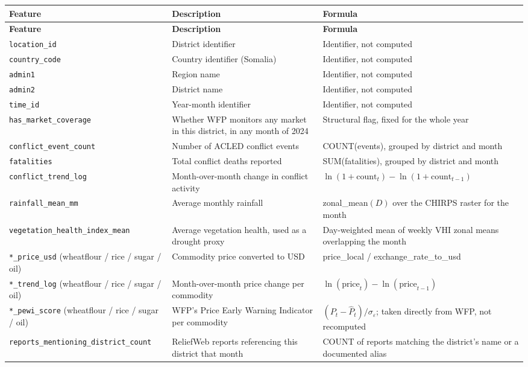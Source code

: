 \documentclass[12pt,a4paper]{article}
\begin{document}
\footnotesize
\begin{longtable}{p{4cm}p{4.3cm}p{5.7cm}}
\toprule
\textbf{Feature} & \textbf{Description} & \textbf{Formula} \\
\midrule
\endfirsthead
\toprule
\textbf{Feature} & \textbf{Description} & \textbf{Formula} \\
\midrule
\endhead
\texttt{location\_id} & District identifier & Identifier, not computed \\
\texttt{country\_code} & Country identifier (Somalia) & Identifier, not computed \\
\texttt{admin1} & Region name & Identifier, not computed \\
\texttt{admin2} & District name & Identifier, not computed \\
\texttt{time\_id} & Year-month identifier & Identifier, not computed \\
\texttt{has\_market\_coverage} & Whether WFP monitors any market in this district, in any month of 2024 & Structural flag, fixed for the whole year \\
\texttt{conflict\_event\_count} & Number of ACLED conflict events & COUNT(events), grouped by district and month \\
\texttt{fatalities} & Total conflict deaths reported & SUM(fatalities), grouped by district and month \\
\texttt{conflict\_trend\_log} & Month-over-month change in conflict activity & $\ln(1+\text{count}_t) - \ln(1+\text{count}_{t-1})$ \\
\texttt{rainfall\_mean\_mm} & Average monthly rainfall & zonal\_mean$(D)$ over the CHIRPS raster for the month \\
\texttt{vegetation\-\_health\-\_index\-\_mean} & Average vegetation health, used as a drought proxy & Day-weighted mean of weekly VHI zonal means overlapping the month \\
\texttt{*\_price\_usd} (wheatflour / rice / sugar / oil) & Commodity price converted to USD & price\_local / exchange\_rate\_to\_usd \\
\texttt{*\_trend\_log} (wheatflour / rice / sugar / oil) & Month-over-month price change per commodity & $\ln(\text{price}_t) - \ln(\text{price}_{t-1})$ \\
\texttt{*\_pewi\_score} (wheatflour / rice / sugar / oil) & WFP's Price Early Warning Indicator per commodity & $(P_t - \hat{P}_t)/\sigma_\varepsilon$; taken directly from WFP, not recomputed \\
\texttt{reports\-\_mentioning\-\_district\-\_count} & ReliefWeb reports referencing this district that month & COUNT of reports matching the district's name or a documented alias \\

\end{longtable}
\end{document}
